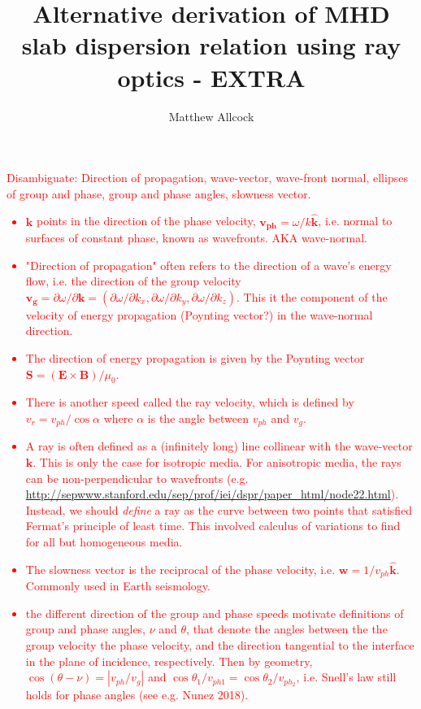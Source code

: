 \documentclass[12pt]{article}
\title{Alternative derivation of MHD slab dispersion relation using ray optics - EXTRA}
\author{Matthew Allcock}
\begin{document}
	\maketitle

	\textcolor{red}{Disambiguate: Direction of propagation, wave-vector, wave-front normal, ellipses of group and phase, group and phase angles, slowness vector.
		\begin{itemize}
			\item $\mathbf{k}$ points in the direction of the phase velocity, $\mathbf{v_{ph}} = \omega/k\mathbf{\hat{k}}$, i.e. normal to surfaces of constant phase, known as wavefronts. AKA wave-normal.
			\item "Direction of propagation" often refers to the direction of a wave's energy flow, i.e. the direction of the group velocity $\mathbf{v_g} = \partial \omega / \partial \mathbf{k} = (\partial \omega / \partial k_x, \partial \omega / \partial k_y, \partial \omega / \partial k_z)$. This it the component of the velocity of energy propagation (Poynting vector?) in the wave-normal direction.
			\item The direction of energy propagation is given by the Poynting vector $\mathbf{S} = (\mathbf{E} \times \mathbf{B})/\mu_0$.
			\item There is another speed called the ray velocity, which is defined by $v_r = v_{ph}/\cos{\alpha}$ where $\alpha$ is the angle between $v_{ph}$ and $v_g$.
			\item A ray is often defined as a (infinitely long) line collinear with the wave-vector $\mathbf{k}$. This is only the case for isotropic media. For anisotropic media, the rays can be non-perpendicular to wavefronts (e.g. \url{http://sepwww.stanford.edu/sep/prof/iei/dspr/paper_html/node22.html}). Instead, we should \textit{define} a ray as the curve between two points that satisfied Fermat's principle of least time. This involved calculus of variations to find for all but homogeneous media.
			\item The slowness vector is the reciprocal of the phase velocity, i.e. $\mathbf{w} = 1/v_{ph} \mathbf{\hat{k}}$. Commonly used in Earth seismology.
			\item the different direction of the group and phase speeds motivate definitions of group and phase angles, $\nu$ and $\theta$, that denote the angles between the the group velocity the phase velocity, and the direction tangential to the interface in the plane of incidence, respectively. Then by geometry, $\cos(\theta - \nu) = |v_{ph} / v_g|$ and $\cos{\theta_1}/v_{ph1} = \cos{\theta_2}/v_{ph_2}$, i.e. Snell's law still holds for phase angles (see e.g. Nunez 2018).
		\end{itemize}
	}
	
\end{document}
